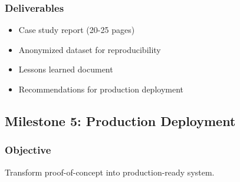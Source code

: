 \documentclass[11pt,letterpaper]{article}
\begin{document}
\subsubsection{Deliverables}
\begin{itemize}[leftmargin=*]
    \item Case study report (20-25 pages)
    \item Anonymized dataset for reproducibility
    \item Lessons learned document
    \item Recommendations for production deployment
\end{itemize}

\subsection{Milestone 5: Production Deployment}

\subsubsection{Objective}
Transform proof-of-concept into production-ready system.
\end{document}
